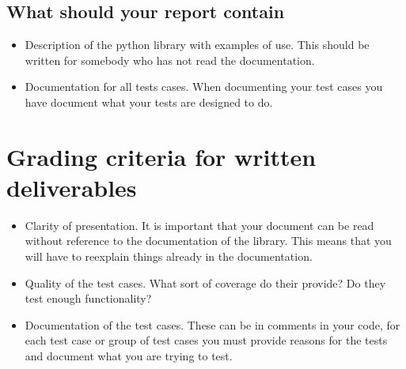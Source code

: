 \documentclass[a4page]{article}
\begin{document}
  \subsection*{What should your report contain}
  \begin{itemize}
  \item Description of the python library with examples of use. This should be
    written for somebody who has not read the documentation.
  \item Documentation for all tests cases.  When documenting your test cases
    you have document what your tests are designed to do.
  \end{itemize}
\section{Grading criteria for written deliverables}
\begin{itemize}
\item Clarity of presentation. It is important that your document can
  be read without reference to the documentation of the library. This
  means that you will have to reexplain things already in the
  documentation. 
\item Quality of the test cases. What sort of coverage do their
  provide? Do they test enough functionality?
\item Documentation of the test cases. These can be in comments in
  your code, for each test case or group of test cases you must
  provide reasons for the tests and document  what you are trying to
  test.
 
\end{itemize}
\end{document}
